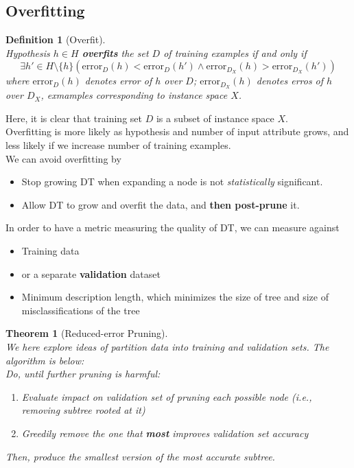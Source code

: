 \documentclass[12pt]{article}
\newtheorem{definition}{Definition}[section]
\newtheorem{theorem}{Theorem}[section]
\theoremstyle{definition}
\begin{document}
\subsection{Overfitting}
\begin{definition}[Overfit]
\hfill\\\normalfont Hypothesis $h\in H$ \textbf{overfits} the set $D$ of training examples if and only if
\[
\exists h'\in H\setminus\{h\} (\mathrm{error}_D(h)<\mathrm{error}_D(h') \land \mathrm{error}_{D_X}(h)>\mathrm{error}_{D_X}(h'))
\]
where $\mathrm{error}_D(h)$ denotes error of $h$ over $D$; $\mathrm{error}_{D_X}(h)$ denotes erros of $h$ over $D_X$, exmamples corresponding to instance space $X$.
\end{definition}
Here, it is clear that training set $D$ is a subset of instance space $X$.\\
Overfitting is more likely as hypothesis and number of input attribute grows, and less likely if we increase number of training examples.\\
We can avoid overfitting by
\begin{itemize}
	\item Stop growing DT when expanding a node is not \textit{statistically} significant.
	\item Allow DT to grow and overfit the data, and \textbf{then post-prune} it.
\end{itemize}
In order to have a metric measuring the quality of DT, we can measure against
\begin{itemize}
	\item Training data
	\item or a separate \textbf{validation} dataset
	\item Minimum description length, which minimizes the size of tree and size of misclassifications of the tree
\end{itemize}
\begin{theorem}[Reduced-error Pruning]
\hfill\\\normalfont
We here explore ideas of partition data into \textit{training} and \textit{validation} sets. The algorithm is below:\\
Do, until further pruning is harmful:
\begin{enumerate}
	\item Evaluate impact on \textit{validation} set of pruning each possible node (i.e., removing subtree rooted at it)
	\item Greedily remove the one that \textbf{most} improves validation set accuracy
\end{enumerate}
Then, produce the smallest version of the most accurate subtree.
\end{theorem}
\end{document}
